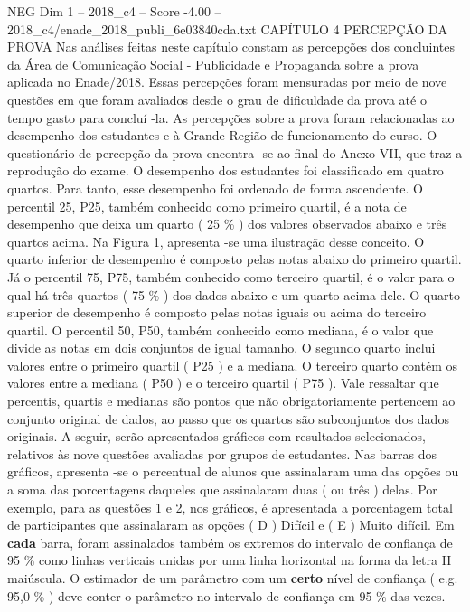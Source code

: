 \begin{textsample}{NEG Dim 1 – 2018\_c4 – Score -4.00 – 2018\_c4/enade\_2018\_publi\_6e03840cda.txt}  \label{ex:f1_neg_137}
CAPÍTULO 4 PERCEPÇÃO DA PROVA Nas análises feitas neste capítulo constam as percepções dos concluintes da Área de Comunicação Social - Publicidade e Propaganda sobre a prova aplicada no Enade/2018.
Essas percepções foram mensuradas por meio de nove questões em que foram avaliados desde o grau de dificuldade da prova até o tempo gasto para concluí -la.
As percepções sobre a prova foram relacionadas ao desempenho dos estudantes e à Grande Região de funcionamento do curso.
O questionário de percepção da prova encontra -se ao final do Anexo VII, que traz a reprodução do exame.
O desempenho dos estudantes foi classificado em quatro quartos.
Para tanto, esse desempenho foi ordenado de forma ascendente.
O percentil 25, P25, também conhecido como primeiro quartil, é a nota de desempenho que deixa um quarto ( 25 \% ) dos valores observados abaixo e três quartos acima.
Na Figura 1, apresenta -se uma ilustração desse conceito.
O quarto inferior de desempenho é composto pelas notas abaixo do primeiro quartil.
Já o percentil 75, P75, também conhecido como terceiro quartil, é o valor para o qual há três quartos ( 75 \% ) dos dados abaixo e um quarto acima dele.
O quarto superior de desempenho é composto pelas notas iguais ou acima do terceiro quartil.
O percentil 50, P50, também conhecido como mediana, é o valor que divide as notas em dois conjuntos de igual tamanho.
O segundo quarto inclui valores entre o primeiro quartil ( P25 ) e a mediana.
O terceiro quarto contém os valores entre a mediana ( P50 ) e o terceiro quartil ( P75 ).
Vale ressaltar que percentis, quartis e medianas são pontos que não obrigatoriamente pertencem ao conjunto original de dados, ao passo que os quartos são subconjuntos dos dados originais.
A seguir, serão apresentados gráficos com resultados selecionados, relativos às nove questões avaliadas por grupos de estudantes.
Nas barras dos gráficos, apresenta -se o percentual de alunos que assinalaram uma das opções ou a soma das porcentagens daqueles que assinalaram duas ( ou três ) delas.
Por exemplo, para as questões 1 e 2, nos gráficos, é apresentada a porcentagem total de participantes que assinalaram as opções ( D ) Difícil e ( E ) Muito difícil.
Em \textbf{cada} barra, foram assinalados também os extremos do intervalo de confiança de 95 \% como linhas verticais unidas por uma linha horizontal na forma da letra H maiúscula.
O estimador de um parâmetro com um \textbf{certo} nível de confiança ( e.g. 95,0 \% ) deve conter o parâmetro no intervalo de confiança em 95 \% das vezes.

\end{textsample}
